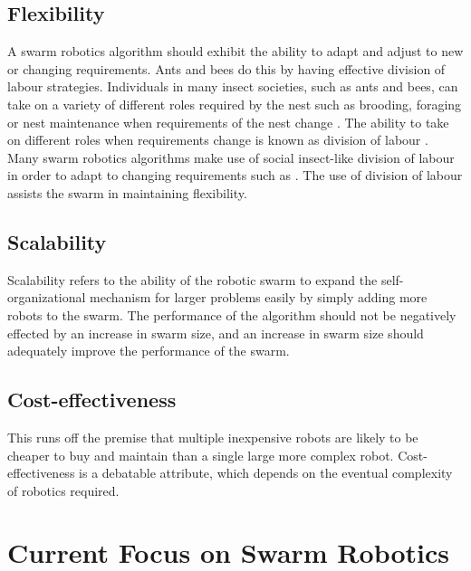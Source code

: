 \subsection{Flexibility}

A swarm robotics algorithm should exhibit the ability to adapt and adjust to new or changing requirements. Ants and bees do this by having effective division of labour strategies. Individuals in many insect societies, such as ants and bees, can take on a variety of different roles required by the nest such as brooding, foraging or nest maintenance when requirements of the nest change \cite{morley1946division}. The ability to take on different roles when requirements change is known as division of labour \cite{beshers2001models}. Many swarm robotics algorithms make use of social insect-like division of labour in order to adapt to changing requirements such as \cite{labella2006division, liu2007towards, gerkey2004formal}. The use of division of labour assists the swarm in maintaining flexibility.

\subsection{Scalability}
Scalability refers to the ability of the robotic swarm to expand the self-organizational mechanism for larger problems easily by simply adding more robots to the swarm. The performance of the algorithm should not be negatively effected by an increase in swarm size, and an increase in swarm size should adequately improve the performance of the swarm. 

\subsection{Cost-effectiveness}
This runs off the premise that multiple inexpensive robots are likely to be cheaper to buy and maintain than a single large more complex robot. Cost-effectiveness is a debatable attribute, which depends on the eventual complexity of robotics required. 



\section{Current Focus on Swarm Robotics}
%

